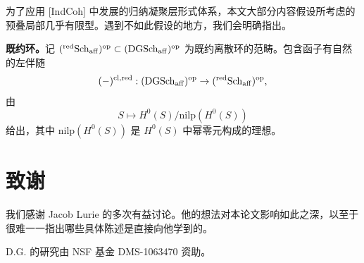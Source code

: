 为了应用 [IndCoh] 中发展的归纳凝聚层形式体系，本文大部分内容假设所考虑的预叠局部几乎有限型。遇到不如此假设的地方，我们会明确指出。

\textbf{既约环。}记 $({}^{\mathrm{red}}\mathrm{Sch}_{\mathrm{aff}})^{\mathrm{op}}\subset(\mathrm{DGSch}_{\mathrm{aff}})^{\mathrm{op}}$ 为既约离散环的范畴。包含函子有自然的左伴随
\[
(-)^{\mathrm{cl,red}}:(\mathrm{DGSch}_{\mathrm{aff}})^{\mathrm{op}}\to({}^{\mathrm{red}}\mathrm{Sch}_{\mathrm{aff}})^{\mathrm{op}},
\]
由
\[
S\mapsto H^0(S)/\mathrm{nilp}(H^0(S))
\]
给出，其中 $\mathrm{nilp}(H^0(S))$ 是 $H^0(S)$ 中幂零元构成的理想。

\section{致谢}

我们感谢 Jacob Lurie 的多次有益讨论。他的想法对本论文影响如此之深，以至于很难一一指出哪些具体陈述是直接向他学到的。

D.G. 的研究由 NSF 基金 DMS-1063470 资助。
